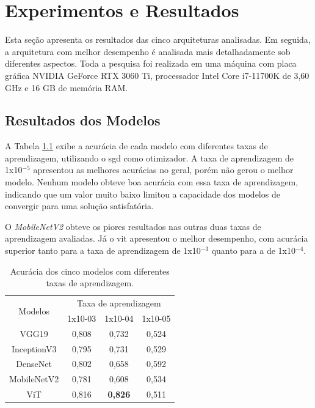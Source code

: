 \chapter{Experimentos e Resultados}\label{cap:resultados}
Esta seção apresenta os resultados das cinco arquiteturas analisadas.
Em seguida, a arquitetura com melhor desempenho é analisada mais detalhadamente sob diferentes aspectos.
Toda a pesquisa foi realizada em uma máquina com placa gráfica NVIDIA GeForce RTX 3060 Ti, processador Intel Core i7-11700K de 3,60 GHz e 16 GB de memória RAM.
\section{Resultados dos Modelos}\label{sec:modelsresults}

A Tabela \ref{tab:metrics} exibe a acurácia de cada modelo com diferentes taxas de aprendizagem, utilizando o \acrshort{sgd} como otimizador.
A taxa de aprendizagem de 1x10$^{-5}$ apresentou as melhores acurácias no geral, porém não gerou o melhor modelo.
Nenhum modelo obteve boa acurácia com essa taxa de aprendizagem, indicando que um valor muito baixo limitou a capacidade dos modelos de convergir para uma solução satisfatória.

O \textit{MobileNetV2} obteve os piores resultados nas outras duas taxas de aprendizagem avaliadas.
Já o \acrshort{vit} apresentou o melhor desempenho, com acurácia superior tanto para a taxa de aprendizagem de 1x10$^{-3}$ quanto para a de 1x10$^{-4}$.

\begin{table}[tb]
\caption{\label{tab:metrics} Acurácia dos cinco modelos com diferentes taxas de aprendizagem.}
\begin{center}
\begin{tabular}{c|ccc}
\toprule
\multirow{2}{*}{Modelos} & \multicolumn{3}{c}{Taxa de aprendizagem}   \\
                         & 1x10-03     & 1x10-04     & 1x10-05     \\
\midrule
VGG19                    & 0,808 & 0,732 & 0,524 \\
\midrule
InceptionV3              & 0,795     & 0,731     & 0,529        \\
\midrule
DenseNet                 & 0,802     & 0,658     & 0,592     \\
\midrule
MobileNetV2              & 0,781  & 0,608 & 0,534 \\
\midrule
ViT                      & 0,816     & \textbf{0,826}     & 0,511     \\
\bottomrule
\end{tabular}
\end{center}

\end{table}

